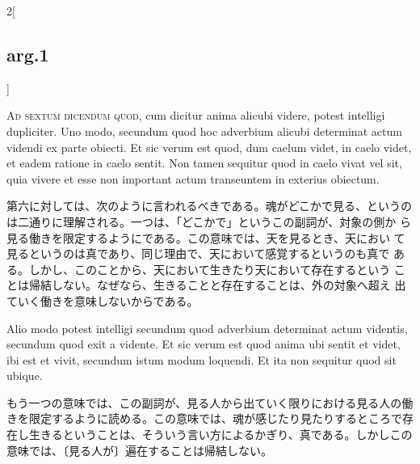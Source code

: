 \documentclass[paper=a4paper,fontsize=10pt,jafontsize=9pt,titlepage]{jlreq}
\begin{document}
\begin{paracol}{2}[\subsection{arg.1}]
\switchcolumn*[\subsection{ad.6}]

{\scshape Ad sextum dicendum quod}, cum dicitur anima alicubi videre, potest
 intelligi dupliciter. Uno modo, secundum quod hoc adverbium alicubi
 determinat actum videndi ex parte obiecti. Et sic verum est quod, dum
 caelum videt, in caelo videt, et eadem ratione in caelo sentit. Non
 tamen sequitur quod in caelo vivat vel sit, quia vivere et esse non
 important actum transeuntem in exterius obiectum.

\switchcolumn

第六に対しては、次のように言われるべきである。魂がどこかで見る、というの
 は二通りに理解される。一つは、「どこかで」というこの副詞が、対象の側か
 ら見る働きを限定するようにである。この意味では、天を見るとき、天におい
 て見るというのは真であり、同じ理由で、天において感覚するというのも真で
 ある。しかし、このことから、天において生きたり天において存在するという
 ことは帰結しない。なぜなら、生きることと存在することは、外の対象へ超え
 出ていく働きを意味しないからである。

\switchcolumn*

Alio modo potest intelligi secundum quod adverbium determinat actum
 videntis, secundum quod exit a vidente. Et sic verum est quod anima ubi
 sentit et videt, ibi est et vivit, secundum istum modum loquendi. Et
 ita non sequitur quod sit ubique.

\switchcolumn

もう一つの意味では、この副詞が、見る人から出ていく限りにおける見る人の働きを限定するように読める。この意味では、魂が感じたり見たりするところで存在し生きるということは、そういう言い方によるかぎり、真である。しかしこの意味では、〔見る人が〕遍在することは帰結しない。

\end{paracol}
\end{document}
